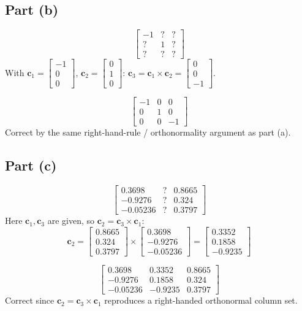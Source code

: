 \documentclass[11pt]{article}
\begin{document}
\subsection*{Part (b)}
\[
    \begin{bmatrix}
        -1 & ? & ? \\
        ? & 1 & ? \\
        ? & ? & ?
    \end{bmatrix}
\]
With $\bm c_1=\begin{bmatrix}-1\\0\\0\end{bmatrix}$, $\bm c_2=\begin{bmatrix}0\\1\\0\end{bmatrix}$: $\bm c_3=\bm c_1\times\bm c_2=\begin{bmatrix}0\\0\\-1\end{bmatrix}$.
\begin{result}
\[
    \begin{bmatrix}
        -1 & 0 & 0 \\
        0 & 1 & 0 \\
        0 & 0 & -1
    \end{bmatrix}
\]
Correct by the same right-hand-rule / orthonormality argument as part (a).
\end{result}

\subsection*{Part (c)}
\[
    \begin{bmatrix}
        0.3698 & ? & 0.8665 \\
        -0.9276 & ? & 0.324 \\
        -0.05236 & ? & 0.3797
    \end{bmatrix}
\]
Here $\bm c_1,\bm c_3$ are given, so $\bm c_2 = \bm c_3\times\bm c_1$:
\[
    \bm c_2 = \begin{bmatrix}0.8665\\0.324\\0.3797\end{bmatrix}\times\begin{bmatrix}0.3698\\-0.9276\\-0.05236\end{bmatrix} = \begin{bmatrix}0.3352\\0.1858\\-0.9235\end{bmatrix}
\]
\begin{result}
\[
    \begin{bmatrix}
        0.3698 & 0.3352 & 0.8665 \\
        -0.9276 & 0.1858 & 0.324 \\
        -0.05236 & -0.9235 & 0.3797
    \end{bmatrix}
\]
Correct since $\bm c_2=\bm c_3\times\bm c_1$ reproduces a right-handed orthonormal column set.
\end{result}
\end{document}
